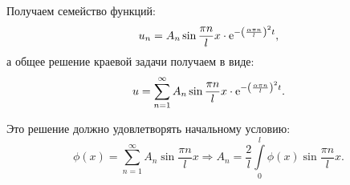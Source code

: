 Получаем семейство функций:
\[
    u_n = A_n\sin\frac{\pi n}{l}x \cdot \mathrm{e}^{-\left(\frac{\alpha\pi n}
    {l}\right)^2t},
\]
а общее решение краевой задачи получаем в виде:
\[
    u = \sum\limits_{n = 1}^\infty A_n\sin\frac{\pi n}{l}x \cdot
    \mathrm{e}^{-\left(\frac{\alpha\pi n}{l}\right)^2t}.
\]

Это решение должно удовлетворять начальному условию:
\[
    \phi(x) = \sum\limits_{n = 1}^\infty A_n\sin\frac{\pi n}{l}x \Rightarrow
    A_n = \frac{2}{l}\int\limits_0^l \phi(x)\sin\frac{\pi n}{l}x.
\]

\newpage %


